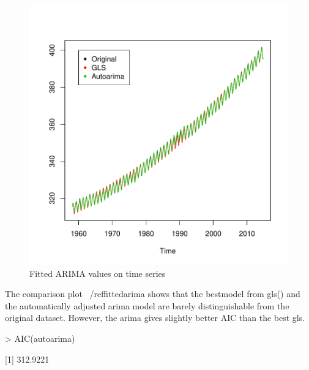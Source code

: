 \documentclass[10pt, a4paper]{article} %
\begin{document}
\begin{figure}[H]
\centering
\begin{Schunk}
\end{Schunk}
\includegraphics{FINAL_VERSION-fittedarima}
\caption{Fitted ARIMA values on time series}
\label{fittedarima}
\end{figure}


The comparison plot ~/ref{fittedarima} shows that the bestmodel from gls() and the automatically adjusted arima model are barely distinguishable from the original dataset. However, the arima gives slightly better AIC than the best gls. 

\begin{Schunk}
\begin{Sinput}
> AIC(autoarima)
\end{Sinput}
[1] 312.9221\end{Schunk}
\end{document}
